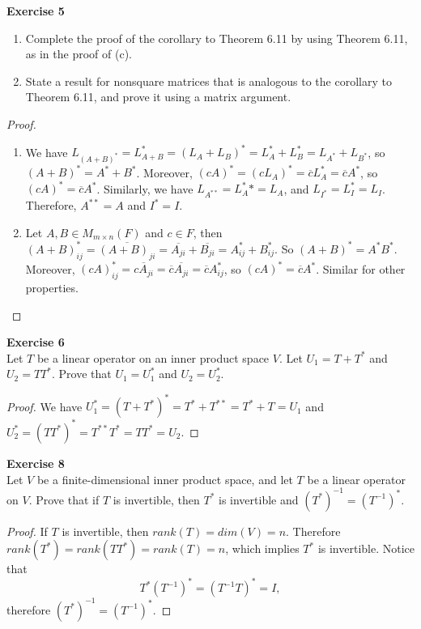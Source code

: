 \documentclass[12pt, a4paper]{article}
\theoremstyle{plain}
\newenvironment{exercise}[2][Exercise]
    { \begin{mdframed}[backgroundcolor=gray!20] \textbf{#1 #2} \\}
    {  \end{mdframed}}
\begin{document}
\begin{exercise}{5}
\hfill
\begin{enumerate}[label=(\alph*)]
\item Complete the proof of the corollary to Theorem 6.11 by using Theorem 6.11, as in the proof of (c).
\item State a result for nonsquare matrices that is analogous to the corollary to Theorem 6.11, and prove it using a matrix argument.
\end{enumerate}
\end{exercise}
	\begin{proof}
		\hfill
	\begin{enumerate}[label=(\alph*)]
	\item We have $L_{(A+B)^*}=L_{A+B}^*=(L_A+L_B)^*=L_A^*+L_B^*=L_{A^*}+L_{B^*}$, so $(A+B)^*=A^*+B^*$. Moreover, $(cA)^*=(cL_{A})^*=\overline{c}L_A^*=\overline{c}A^*$, so $(cA)^*=\overline{c}A^*$. Similarly, we have $L_{A^{**}}=L_A^**=L_A$, and $L_{I^*}=L_I^*=L_I$. Therefore, $A^{**}=A$ and $I^*=I$.
	\item Let $A,B\in M_{m\times n}(F)$ and $c\in F$, then $(A+B)^*_{ij}=\overline{(A+B)_{ji}}=\overline{A_{ji}}+\overline{B_{ji}} = A^*_{ij}+B^*_{ij}$. So $(A+B)^*=A^* B^*$. Moreover, $(cA)^*_{ij}=\overline{cA_{ji}} = \overline{c}\overline{A_{ji}} = \overline{c}A^*_{ij}$, so $(cA)^* = \overline{c}A^*$. Similar for other properties.
	\end{enumerate}
	\end{proof}

\begin{exercise}{6}
Let $T$ be a linear operator on an inner product space $V$. Let $U_1 = T+T^*$ and $U_2=TT^*$. Prove that $U_1=U_1^*$ and $U_2=U_2^*$.
\end{exercise}
	\begin{proof}
	We have $U_1^* = (T+T^*)^*=T^*+T^{**}=T^*+T=U_1$ and $U_2^*=(TT^*)^*=T^{**}T^*=TT^* = U_2$.
	\end{proof}

\begin{exercise}{8}
Let $V$ be a finite-dimensional inner product space, and let $T$ be a linear operator on $V$. Prove that if $T$ is invertible, then $T^*$ is invertible and $(T^*)^{-1} = (T^{-1})^*$.
\end{exercise}
	\begin{proof}
	If $T$ is invertible, then $rank(T) = dim(V)=n$. Therefore $rank(T^*)=rank(TT^*)=rank(T)=n$, which implies $T^*$ is invertible. Notice that
	\[
	T^*(T^{-1})^*=(T^{-1}T)^*=I,
	\]
	therefore $(T^*)^{-1}=(T^{-1})^*$.
	\end{proof}
\end{document}
